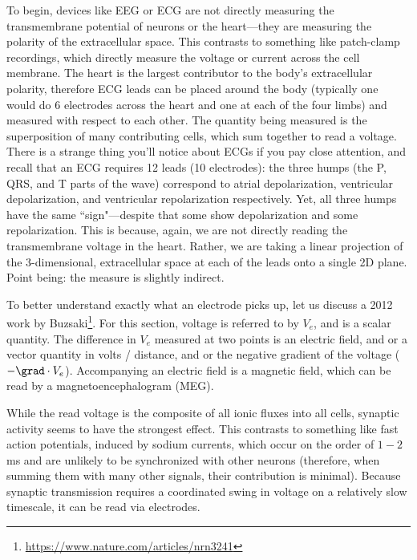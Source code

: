 To begin, devices like EEG or ECG are not directly measuring the transmembrane potential of neurons or the heart---they are measuring the polarity of the extracellular space. This contrasts to something like patch-clamp recordings, which directly measure the voltage or current across the cell membrane. The heart is the largest contributor to the body's extracellular polarity, therefore ECG leads can be placed around the body (typically one would do 6 electrodes across the heart and one at each of the four limbs) and measured with respect to each other. The quantity being measured is the superposition of many contributing cells, which sum together to read a voltage. There is a strange thing you'll notice about ECGs if you pay close attention, and recall that an ECG requires 12 leads (10 electrodes): the three humps (the P, QRS, and T parts of the wave) correspond to atrial depolarization, ventricular depolarization, and ventricular repolarization respectively. Yet, all three humps have the same ``sign"---despite that some show depolarization and some repolarization. This is because, again, we are not directly reading the transmembrane voltage in the heart. Rather, we are taking a linear projection of the 3-dimensional, extracellular space at each of the leads onto a single 2D plane. Point being: the measure is slightly indirect. \newline

To better understand exactly what an electrode picks up, let us discuss a 2012 work by Buzsaki\footnote{\url{https://www.nature.com/articles/nrn3241}}. For this section, voltage is referred to by $V_e$, and is a scalar quantity. The difference in $V_e$ measured at two points is an electric field, and or a vector quantity in volts / distance, and or the negative gradient of the voltage ($-\grad \cdot V_e$). Accompanying an electric field is a magnetic field, which can be read by a magnetoencephalogram (MEG).\newline

    While the read voltage is the composite of all ionic fluxes into all cells, synaptic activity seems to have the strongest effect. This contrasts to something like fast action potentials, induced by sodium currents, which occur on the order of $1-2$ms and are unlikely to be synchronized with other neurons (therefore, when summing them with many other signals, their contribution is minimal). Because synaptic transmission requires a coordinated swing in voltage on a relatively slow timescale, it can be read via electrodes.\newline
    
